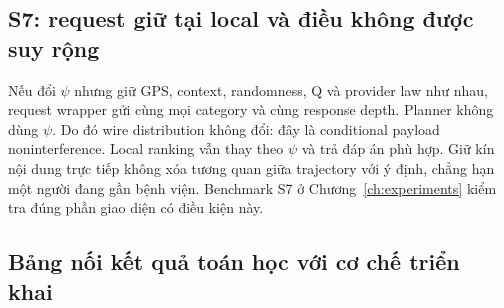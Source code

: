 \subsection{S7: request giữ tại local và điều không được suy rộng}
Nếu đổi $\psi$ nhưng giữ GPS, context, randomness, Q và provider law như nhau, request wrapper
gửi cùng mọi category và cùng response depth. Planner không dùng $\psi$. Do đó wire distribution
không đổi: đây là conditional payload noninterference. Local ranking vẫn thay theo $\psi$ và trả
đáp án phù hợp. Giữ kín nội dung trực tiếp không xóa tương quan giữa trajectory với ý định, chẳng
hạn một người đang gần bệnh viện. Benchmark S7 ở Chương~\ref{ch:experiments} kiểm tra đúng phần
giao diện có điều kiện này.

\subsection{Bảng nối kết quả toán học với cơ chế triển khai}
